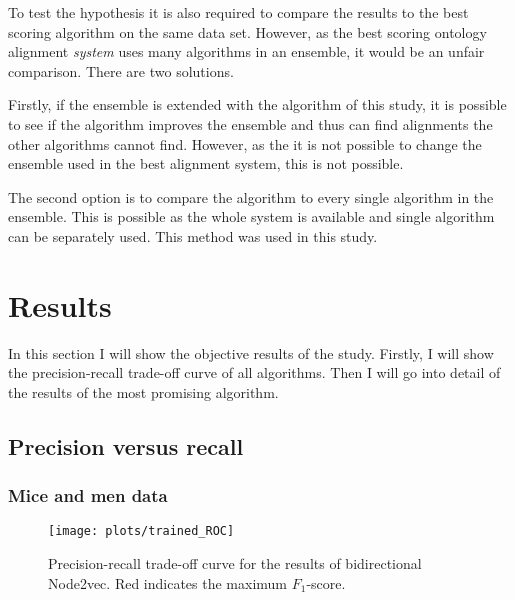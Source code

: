 \documentclass{article}
\begin{document}
 To test the hypothesis it is also required to compare the results to the best scoring algorithm on the same data set. However, as the best scoring ontology alignment \textit{system} uses many algorithms in an ensemble, it would be an unfair comparison. There are two solutions. 
 
 Firstly, if the ensemble is extended with the algorithm of this study, it is possible to see if the algorithm improves the ensemble and thus can find alignments the other algorithms cannot find.
 However, as the it is not possible to change the ensemble used in the best alignment system, this is not possible.
 
 The second option is to compare the algorithm to every single algorithm in the ensemble. This is possible as the whole system is available and single algorithm can be separately used. This method was used in this study.
 
 \newpage
 \section{Results} \label{results}
 
 In this section I will show the objective results of the study. Firstly, I will show the precision-recall trade-off curve of all algorithms. Then I will go into detail of the results of the most promising algorithm.

 \subsection{Precision versus recall}
  \subsubsection{Mice and men data}
  \begin{figure}[H]
   \centering
   \texttt{[image: plots/trained\_ROC]}
   \caption[Precision-recall curve trained mice model]{Precision-recall trade-off curve for the results of bidirectional Node2vec. Red indicates the maximum $F_1$-score.}
   \label{ROC_trained}
  \end{figure}
 
\end{document}
